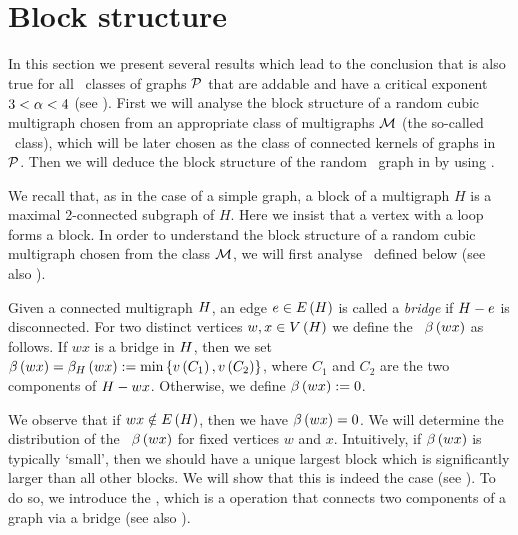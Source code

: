 \section{Block structure}\label{CBsec:block_structure}
In this section we present several results which lead to the conclusion that  is also true for all \pl\ classes of graphs $\mathcal{P}$ that are addable and have a critical exponent $3<\alpha<4$ (see ). First we will analyse the block structure of a random cubic multigraph chosen from an appropriate class of multigraphs $\mathcal{M}$ (the so-called \bridgeStable\ class), which will be later chosen as the class of connected kernels of graphs in $\mathcal{P}$. Then we will deduce the block structure of the random \pl\ graph in  by using . 

We recall that, as in the case of a simple graph, a block of a multigraph $H$ is a maximal 2-connected subgraph of $H$. Here we insist that a vertex with a loop forms a block. In order to understand the block structure of a random cubic multigraph chosen from the class $\mathcal{M}$, we will first analyse \bridgeNumbers\ defined below (see also ). 

\begin{definition}[\BridgeNumber]\label{CBdef:bridge_number}
	Given a connected multigraph $H$, an edge $e \in E\left(H\right)$ is called a {\em bridge} if $H-e$ is disconnected. For two distinct vertices $w, x \in V\left(H\right)$ we define the \bridgeNumber\ $\beta\left(wx\right)$ as follows. If $wx$ is a bridge in $H$, then we set $\beta\left(wx\right)=\beta_{H}\left(wx\right):=\min\left\{v\left({C_1}\right), v\left({C_2}\right)\right\}$, where $C_1$ and $C_2$ are the two components of $H-wx$. Otherwise, we define $\beta\left(wx\right):=0$.
\end{definition}

We observe that if $wx\notin E\left(H\right)$, then we have $\beta\left(wx\right)=0$. We will determine the distribution of the \bridgeNumber\ $\beta\left(wx\right)$ for fixed vertices $w$ and $x$. Intuitively, if $\beta\left(wx\right)$ is typically \lq small\rq, then we should have a unique largest block which is significantly larger than all other blocks. We will show that this is indeed the case (see ). To do so, we introduce the \bridgeInsertion, which is a operation that connects two components of a graph via a bridge (see also ).


